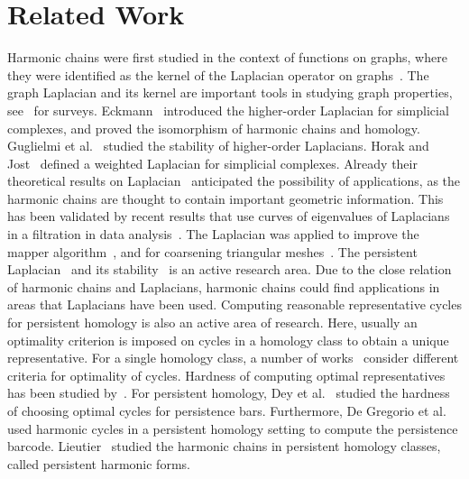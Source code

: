 \documentclass[10pt,a4paper]{amsart}
\newcommand{\etal}{{et al.}}
\theoremstyle{definition}
\theoremstyle{remark}
\begin{document}
\section{Related Work}
\label{sec:related-work}

Harmonic chains were first studied in the context of functions on graphs, where they were identified as the kernel of the Laplacian operator on graphs~\cite{Kirchhoff1847}. 
The graph Laplacian and its kernel are important tools in studying graph properties, see~\cite{Merris1994,MoharAlaviChartrand1991} for surveys. 
Eckmann~\cite{Eckmann1944} introduced the higher-order Laplacian for simplicial complexes, and proved the isomorphism of harmonic chains and homology. 
Guglielmi \etal~\cite{GuglielmiSavostianovTudisco2023} studied the stability of higher-order Laplacians. Horak and Jost~\cite{HorakJost2013} defined a weighted Laplacian for simplicial complexes. Already their theoretical results on Laplacian~\cite{HorakJost2013} anticipated the possibility of applications, as the harmonic chains are thought to contain important geometric information.
This has been validated by recent results that use curves of eigenvalues of Laplacians in a filtration in data analysis~\cite{ChenQiuWang2022, WangNguyenWei2020}. 
The Laplacian was applied to improve the mapper algorithm~\cite{MikePerea2019}, and for coarsening triangular meshes~\cite{KerosSubr2023}. 
The persistent Laplacian~\cite{MemoliWanWang2022} and its stability~\cite{LiuLiWu2023} is an active research area. 
Due to the close relation of harmonic chains and Laplacians, harmonic chains could find applications in areas that Laplacians have been used.
Computing reasonable representative cycles for persistent homology is also an active area of research. 
Here, usually an optimality criterion is imposed on cycles in a homology class to obtain a unique representative. For a single homology class, a number of works~\cite{Chen2010,DeyHiraniKrishnamoorthy2010, DeyHouMandal2020, Obayashi2018,Oleksiy2010, ChambersParsaSchreiber2022, ChenFreedman2011, DeyHiraniKrishnamoorthy2010, LeeChungChoi2019} consider different criteria for optimality of cycles. Hardness of computing optimal representatives has been studied by~\cite{ChenFreedman2011, chambers2019minimum, Chambers2009, ChambersParsaSchreiber2022, Borradaile2020, Grochow2018, DeyHouMandal2020}. For persistent homology, Dey et al.~\cite{DeyHouMandal2020} studied the hardness of choosing optimal cycles for persistence bars. 
Furthermore, De Gregorio et al.~\cite{DeGregorioGuerraScaramuccia2021} used harmonic cycles in a persistent homology setting to compute the persistence barcode. Lieutier~\cite{Lieutier} studied the harmonic chains in persistent homology classes, called persistent harmonic forms.
\end{document}
